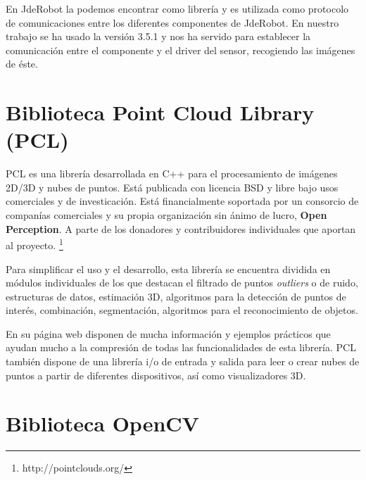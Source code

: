 En JdeRobot la podemos encontrar como librería y es utilizada como protocolo de comunicaciones entre los diferentes componentes de JdeRobot. En nuestro trabajo se ha usado la versión 3.5.1 y nos ha servido para establecer la comunicación entre el componente y el driver del sensor, recogiendo las imágenes de éste.

\section{Biblioteca Point Cloud Library (PCL)}

PCL es una librería desarrollada en C++ para el procesamiento de imágenes 2D/3D y nubes de puntos. Está publicada con licencia BSD y libre bajo usos comerciales y de investicación. Está financialmente soportada por un consorcio de companías comerciales y su propia organización sin ánimo de lucro, \textbf{Open Perception}. A parte de los donadores y contribuidores individuales que aportan al proyecto. \footnote{http://pointclouds.org/}

Para simplificar el uso y el desarrollo, esta librería se encuentra dividida en módulos individuales de los que destacan el filtrado de puntos \textit{outliers} o de ruido, estructuras de datos, estimación 3D, algoritmos para la detección de puntos de interés, combinación, segmentación, algoritmos para el reconocimiento de objetos.


En su página web disponen de mucha información y ejemplos prácticos que ayudan mucho a la compresión de todas las funcionalidades de esta librería. PCL también dispone de una librería i/o de entrada y salida para leer o crear nubes de puntos a partir de diferentes dispositivos, así como visualizadores 3D.


\section{Biblioteca OpenCV}

